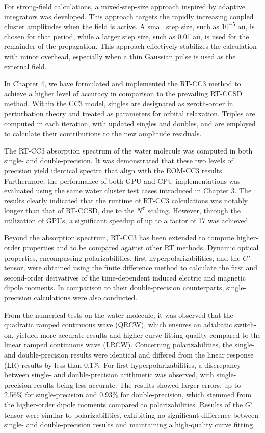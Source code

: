 For strong-field calculations, a mixed-step-size approach inspired by adaptive integrators was developed. This approach targets the rapidly increasing coupled cluster amplitudes when the field is active. A small step size, such as $10^{-5}$ au, is chosen for that period, while a larger step size, such as 0.01 au, is used for the remainder of the propagation. This approach effectively stabilizes the calculation with minor overhead, especially when a thin Gaussian pulse is used as the external field.

In Chapter 4, we have formulated and implemented the RT-CC3 method to achieve a higher level of accuracy in comparison to the prevailing RT-CCSD method. Within the CC3 model, singles are designated as zeroth-order in perturbation theory and treated as parameters for orbital relaxation. Triples are computed in each iteration, with updated singles and doubles, and are employed to calculate their contributions to the new amplitude residuals.

The RT-CC3 absorption spectrum of the water molecule was computed in both single- and double-precision. It was demonstrated that these two levels of precision yield identical spectra that align with the EOM-CC3 results. Furthermore, the performance of both GPU and CPU implementations was evaluated using the same water cluster test cases introduced in Chapter 3. The results clearly indicated that the runtime of RT-CC3 calculations was notably longer than that of RT-CCSD, due to the $N^{7}$ scaling. However, through the utilization of GPUs, a significant speedup of up to a factor of 17 was achieved.

Beyond the absorption spectrum, RT-CC3 has been extended to compute higher-order properties and to be compared against other RT methods. Dynamic optical properties, encompassing polarizabilities, first hyperpolarizabilities, and the $G'$ tensor, were obtained using the finite difference method to calculate the first and second-order derivatives of the time-dependent induced electric and magnetic dipole moments. In comparison to their double-precision counterparts, single-precision calculations were also conducted.

From the numerical tests on the water molecule, it was observed that the quadratic ramped continuous wave (QRCW), which ensures an adiabatic switch-on, yielded more accurate results and higher curve fitting quality compared to the linear ramped continuous wave (LRCW). Concerning polarizabilities, the single- and double-precision results were identical and differed from the linear response (LR) results by less than 0.1\%. For first hyperpolarizabilities, a discrepancy between single- and double-precision arithmetic was observed, with single-precision results being less accurate. The results showed larger errors, up to 2.56\% for single-precision and 0.93\% for double-precision, which stemmed from the higher-order dipole moments compared to polarizabilities. Results of the $G'$ tensor were similar to polarizabilities, exhibiting no significant difference between single- and double-precision results and maintaining a high-quality curve fitting.

